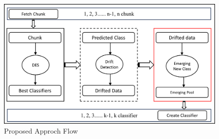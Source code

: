 \begin{figure}[ht]
	\centering
	\includegraphics[width=1\linewidth]{5_Emerging/images/pro1.png}
	\caption{Proposed Approch Flow}
	\label{fig:proposal_step_1}
\end{figure}

